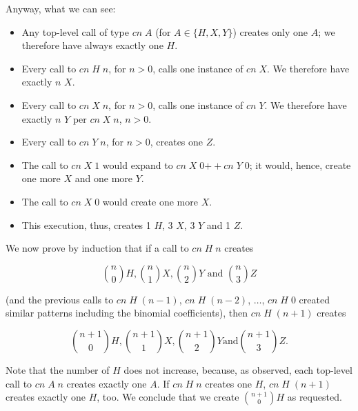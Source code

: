 \documentclass[tikz]{scrreprt}
\newcommand{\Conid}[1]{\mathit{#1}}
\newcommand{\Varid}[1]{\mathit{#1}}
\newcommand{\plus}{\mathbin{+\!\!\!+}}
\begin{document}
Anyway, what we can see:
\begin{itemize}
\item Any top-level call of type \ensuremath{\Varid{cn}\;\Conid{A}} 
      (for $A \in \lbrace H,X,Y\rbrace$)
      creates only one \ensuremath{\Conid{A}};
      we therefore have always exactly one \ensuremath{\Conid{H}}.
\item Every call to \ensuremath{\Varid{cn}\;\Conid{H}\;\Varid{n}}, for $n > 0$,
      calls one instance of \ensuremath{\Varid{cn}\;\Conid{X}}.
      We therefore have exactly $n$ \ensuremath{\Conid{X}}.
\item Every call to \ensuremath{\Varid{cn}\;\Conid{X}\;\Varid{n}}, for $n > 0$,
      calls one instance of \ensuremath{\Varid{cn}\;\Conid{Y}}.
      We therefore have exactly $n$ \ensuremath{\Conid{Y}} per \ensuremath{\Varid{cn}\;\Conid{X}\;\Varid{n}},
      $n > 0$.
\item Every call to \ensuremath{\Varid{cn}\;\Conid{Y}\;\Varid{n}}, for $n>0$, creates one \ensuremath{\Conid{Z}}.
\item The call to \ensuremath{\Varid{cn}\;\Conid{X}\;\mathrm{1}} would expand to
      \ensuremath{\Varid{cn}\;\Conid{X}\;\mathrm{0}\plus \Varid{cn}\;\Conid{Y}\;\mathrm{0}}; it would, hence,
      create one more \ensuremath{\Conid{X}} and one more \ensuremath{\Conid{Y}}.
\item The call to \ensuremath{\Varid{cn}\;\Conid{X}\;\mathrm{0}} would create one more \ensuremath{\Conid{X}}.
\item This execution, thus, creates
      1 \ensuremath{\Conid{H}}, 3 \ensuremath{\Conid{X}}, 3 \ensuremath{\Conid{Y}} and 1 \ensuremath{\Conid{Z}}.
\end{itemize}

We now prove by induction that if a call to \ensuremath{\Varid{cn}\;\Conid{H}\;\Varid{n}}
creates 

\[
\binom{n}{0}H, \binom{n}{1}X, \binom{n}{2}Y 
\text{ and } \binom{n}{3}Z
\]

(and the previous calls to \ensuremath{\Varid{cn}\;\Conid{H}\;(\Varid{n}\mathbin{-}\mathrm{1})}, \ensuremath{\Varid{cn}\;\Conid{H}\;(\Varid{n}\mathbin{-}\mathrm{2})},
$\dots$, \ensuremath{\Varid{cn}\;\Conid{H}\;\mathrm{0}} created similar patterns including
the binomial coefficients),
then \ensuremath{\Varid{cn}\;\Conid{H}\;(\Varid{n}\mathbin{+}\mathrm{1})} creates

\[
\binom{n+1}{0}H, \binom{n+1}{1}X, \binom{n+1}{2}Y 
\text{and} \binom{n+1}{3}Z.
\]

Note that the number of \ensuremath{\Conid{H}} does not increase,
because, as observed, each top-level call to \ensuremath{\Varid{cn}\;\Conid{A}\;\Varid{n}}
creates exactly one \ensuremath{\Conid{A}}.
If \ensuremath{\Varid{cn}\;\Conid{H}\;\Varid{n}} creates one \ensuremath{\Conid{H}},
\ensuremath{\Varid{cn}\;\Conid{H}\;(\Varid{n}\mathbin{+}\mathrm{1})} creates exactly one \ensuremath{\Conid{H}}, too.
We conclude that we create $\binom{n+1}{0}H$ as requested.
\end{document}
